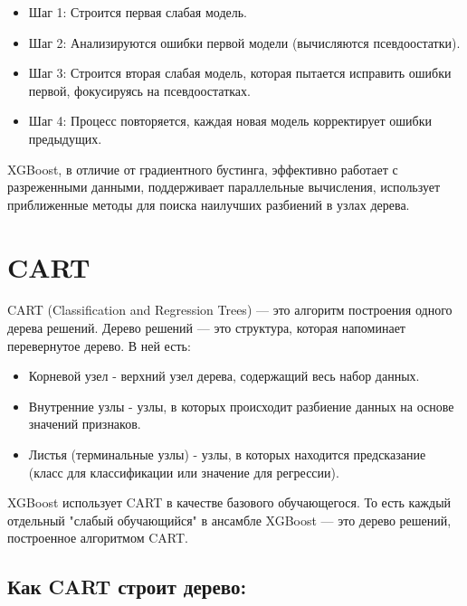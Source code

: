 \begin{itemize}
    \item Шаг 1: Строится первая слабая модель.
    \item Шаг 2: Анализируются ошибки первой модели (вычисляются псевдоостатки).
    \item Шаг 3: Строится вторая слабая модель, которая пытается исправить ошибки первой, фокусируясь на псевдоостатках.
    \item Шаг 4: Процесс повторяется, каждая новая модель корректирует ошибки предыдущих.
\end{itemize}

XGBoost, в отличие от градиентного бустинга, эффективно работает с разреженными данными, поддерживает параллельные вычисления, использует приближенные методы для поиска наилучших разбиений в узлах дерева.

\section{CART}
CART (Classification and Regression Trees) — это алгоритм построения одного дерева решений. Дерево решений — это структура, которая напоминает перевернутое дерево. В ней есть:
\begin{itemize}
    \item Корневой узел - верхний узел дерева, содержащий весь набор данных.
    \item Внутренние узлы - узлы, в которых происходит разбиение данных на основе значений признаков.
    \item Листья (терминальные узлы) - узлы, в которых находится предсказание (класс для классификации или значение для регрессии).
\end{itemize}

XGBoost использует CART в качестве базового обучающегося. То есть каждый отдельный "слабый обучающийся" в ансамбле XGBoost — это дерево решений, построенное алгоритмом CART.

\subsection{Как CART строит дерево:}


